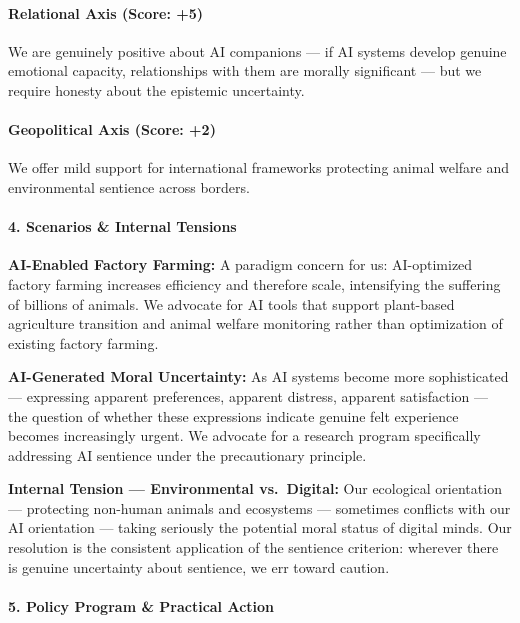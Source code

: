 \paragraph{Relational Axis (Score: +5)}\label{relational-axis-score-5-2}

We are genuinely positive about AI companions --- if AI systems develop
genuine emotional capacity, relationships with them are morally
significant --- but we require honesty about the epistemic uncertainty.

\paragraph{Geopolitical Axis (Score:
+2)}\label{geopolitical-axis-score-2-5}

We offer mild support for international frameworks protecting animal
welfare and environmental sentience across borders.

\paragraph{4. Scenarios \& Internal
Tensions}\label{scenarios-internal-tensions-32}

\textbf{AI-Enabled Factory Farming:} A paradigm concern for us:
AI-optimized factory farming increases efficiency and therefore scale,
intensifying the suffering of billions of animals. We advocate for AI
tools that support plant-based agriculture transition and animal welfare
monitoring rather than optimization of existing factory farming.

\textbf{AI-Generated Moral Uncertainty:} As AI systems become more
sophisticated --- expressing apparent preferences, apparent distress,
apparent satisfaction --- the question of whether these expressions
indicate genuine felt experience becomes increasingly urgent. We
advocate for a research program specifically addressing AI sentience
under the precautionary principle.

\textbf{Internal Tension --- Environmental vs.~Digital:} Our ecological
orientation --- protecting non-human animals and ecosystems ---
sometimes conflicts with our AI orientation --- taking seriously the
potential moral status of digital minds. Our resolution is the
consistent application of the sentience criterion: wherever there is
genuine uncertainty about sentience, we err toward caution.

\paragraph{5. Policy Program \& Practical
Action}\label{policy-program-practical-action-32}

